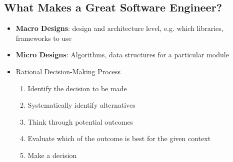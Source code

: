 \documentclass[a4paper]{article}
\begin{document}
\subsection{What Makes a Great Software Engineer?}
\begin{itemize}
    \item \textbf{Macro Designs}: design and architecture level, e.g. which libraries, frameworks to use
    \item \textbf{Micro Designs}: Algorithms, data structures for a particular module
    \item Rational Decision-Making Process
    \begin{enumerate}
        \item Identify the decision to be made
        \item Systematically identify alternatives
        \item Think through potential outcomes
        \item Evaluate which of the outcome is best for the given context
        \item Make a decision
    \end{enumerate}
\end{itemize}
\end{document}
